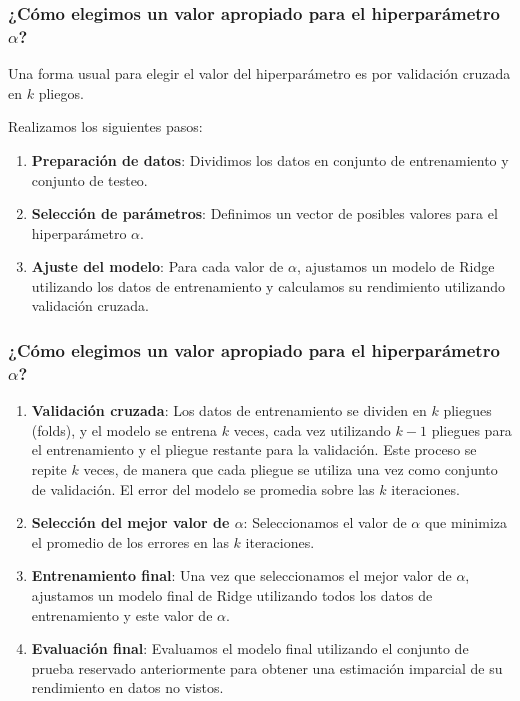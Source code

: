 \documentclass[aspectratio=169,12pt]{beamer}
\begin{document}
\begin{frame}
\frametitle{¿Cómo elegimos un valor apropiado para el hiperparámetro $\alpha$?}

Una forma usual para elegir el valor del hiperparámetro es por validación cruzada en $k$ pliegos.

Realizamos los siguientes pasos:

\begin{enumerate}
\item \textbf{Preparación de datos}: Dividimos los datos en conjunto de entrenamiento y conjunto de testeo. 

\item \textbf{Selección de parámetros}: Definimos un vector de posibles valores para el hiperparámetro $\alpha$. 

\item \textbf{Ajuste del modelo}: Para cada valor de $\alpha$, ajustamos un modelo de Ridge utilizando los datos de entrenamiento y calculamos su rendimiento utilizando validación cruzada.
\label{end-enumerate}%
\end{enumerate}
\end{frame}

\begin{frame}
\frametitle{¿Cómo elegimos un valor apropiado para el hiperparámetro $\alpha$?}

\begin{enumerate}
\item \textbf{Validación cruzada}: Los datos de entrenamiento se dividen en $k$ pliegues (folds), y el modelo se entrena $k$ veces, cada vez utilizando $k-1$ pliegues para el entrenamiento y el pliegue restante para la validación. Este proceso se repite $k$ veces, de manera que cada pliegue se utiliza una vez como conjunto de validación. El error del modelo se promedia sobre las $k$ iteraciones.

\item \textbf{Selección del mejor valor de $\alpha$}: Seleccionamos el valor de $\alpha$ que minimiza el promedio de los errores en las $k$ iteraciones. 
    
\item \textbf{Entrenamiento final}: Una vez que seleccionamos el mejor valor de $\alpha$, ajustamos un modelo final de Ridge utilizando todos los datos de entrenamiento y este valor de $\alpha$.

\item \textbf{Evaluación final}: Evaluamos el modelo final utilizando el conjunto de prueba reservado anteriormente para obtener una estimación imparcial de su rendimiento en datos no vistos.
\end{enumerate}
\end{frame}
\end{document}
